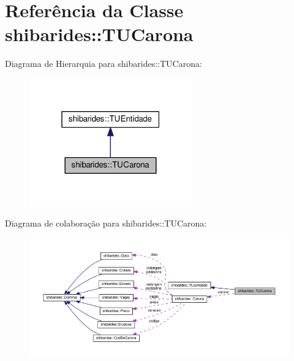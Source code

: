 \hypertarget{classshibarides_1_1TUCarona}{}\section{Referência da Classe shibarides\+:\+:T\+U\+Carona}
\label{classshibarides_1_1TUCarona}


Diagrama de Hierarquia para shibarides\+:\+:T\+U\+Carona\+:
\nopagebreak
\begin{figure}[H]
\begin{center}
\leavevmode
\includegraphics[width=199pt]{classshibarides_1_1TUCarona__inherit__graph}
\end{center}
\end{figure}


Diagrama de colaboração para shibarides\+:\+:T\+U\+Carona\+:
\nopagebreak
\begin{figure}[H]
\begin{center}
\leavevmode
\includegraphics[width=350pt]{classshibarides_1_1TUCarona__coll__graph}
\end{center}
\end{figure}
